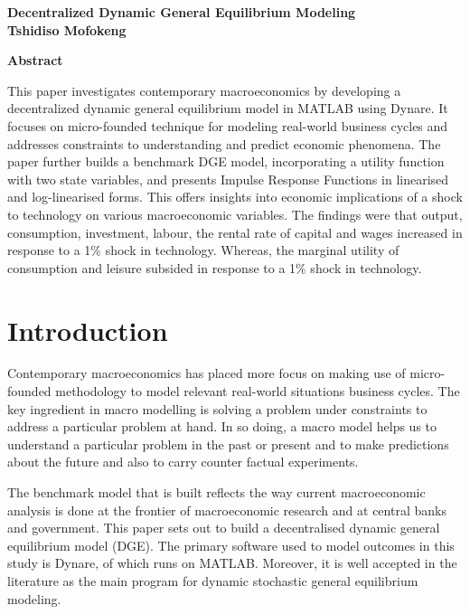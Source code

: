 \documentclass[
  11pt,
  justified]{article}
\author{}
\date{\vspace{-2.5em}}
\begin{document}
\begin{center}
  \Huge{\textbf{Decentralized Dynamic General Equilibrium Modeling\\}}
  \vspace*{0.5cm}
  \Large{\textbf{Tshidiso Mofokeng\\}}
  \par
  \vspace*{2cm}
\end{center}

\begin{center}
\textbf{Abstract}
\end{center}

This paper investigates contemporary macroeconomics by developing a
decentralized dynamic general equilibrium model in MATLAB using Dynare.
It focuses on micro-founded technique for modeling real-world business
cycles and addresses constraints to understanding and predict economic
phenomena. The paper further builds a benchmark DGE model, incorporating
a utility function with two state variables, and presents Impulse
Response Functions in linearised and log-linearised forms. This offers
insights into economic implications of a shock to technology on various
macroeconomic variables. The findings were that output, consumption,
investment, labour, the rental rate of capital and wages increased in
response to a 1\% shock in technology. Whereas, the marginal utility of
consumption and leisure subsided in response to a 1\% shock in
technology.

\hypertarget{introduction}{%
\section{Introduction}\label{introduction}}

Contemporary macroeconomics has placed more focus on making use of
micro-founded methodology to model relevant real-world situations
business cycles. The key ingredient in macro modelling is solving a
problem under constraints to address a particular problem at hand. In so
doing, a macro model helps us to understand a particular problem in the
past or present and to make predictions about the future and also to
carry counter factual experiments.

The benchmark model that is built reflects the way current macroeconomic
analysis is done at the frontier of macroeconomic research and at
central banks and government. This paper sets out to build a
decentralised dynamic general equilibrium model (DGE). The primary
software used to model outcomes in this study is Dynare, of which runs
on MATLAB. Moreover, it is well accepted in the literature as the main
program for dynamic stochastic general equilibrium modeling.
\end{document}
